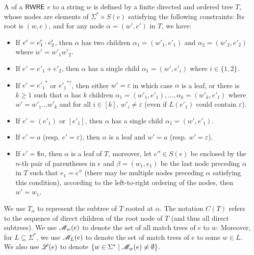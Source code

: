   \begin{definition}
  	A  of a ${\sf RWRE}$ $e$ to a string $w$ is defined by a finite directed and ordered
  	tree $T$, whose nodes are elements of $\Sigma^{\ast} \times S (e)$ satisfying the following constraints: Its root is $(w, e)$, and for any node $\alpha =
  	(w', e')$ in $T$, we have:
  	\begin{itemize}
  		\item If $e' = e'_1 \cdot e'_2$, then $\alpha$ has two children $\alpha_1 = (w'_1,
  		e'_1)$ and $\alpha_2=(w'_2, e'_2)$ where $w' = w'_1 w'_2$.
  		
  		\item If $e' = e'_1 + e'_2$, then $\alpha$ has a single child $\alpha_1 = (w',
  		e'_i)$ where $i \in \{ 1, 2 \}$.
  		
  		\item If $e' = {e'_1}^{\ast}$ or ${e'_1}^{\ast ?}$, then either $w' = \varepsilon$ in which case $\alpha$ is a
  		leaf, or there is $k \geqslant 1$ such that $\alpha$ has $k$ children $\alpha_1 = (w'_1,
  		e'_1), \ldots, \alpha_k = (w'_k, e'_1)$ where $w' = w'_1 \ldots w'_k$ and for all
  		$i \in [k]$, $w'_i \neq \varepsilon$ (even if  $L
  		(e'_1)$ could contain $\varepsilon$).
%
%		
  		\item If $e' = (e'_1)$ or $[e'_1]$, then $\alpha$ has a single child $\alpha_1 = (w', e'_1)$.
  		\item If $e' = a$ (resp. $e' = \varepsilon$), then $\alpha$ is a leaf and
  		$w' = a$ (resp. $w' = \varepsilon$).
%		
		\item If $e' = \$n$, then $\alpha$ is a leaf of $T$, moreover, let $e'' \in S(e)$ be enclosed by the $n$-th pair of parentheses in $e$ and $\beta = (w_1, e_1)$ be the last node preceding $\alpha$ in $T$ such that $e_1 = e''$ (there may be multiple nodes preceding $\alpha$ satisfying this condition), 
		according to the left-to-right ordering of the nodes, then $w' = w_1$.
  	\end{itemize}
  	
 We use $T_\alpha$ to represent the subtree of $T$ rooted at $\alpha$.
The notation $C(T)$ refers to the sequence of direct children of the root node of $T$ (and thus all direct subtrees).
%
We use $\mathscr{M}_{w}(e)$ to denote the set of all match trees of $e$ to $w$. Moreover, for $L \subseteq \Sigma^\ast$, we use $\mathscr{M}_{L}(e)$ to denote the set of match trees of $e$ to some $w \in L$.
We also use $\mathscr{L}(e)$ to denote $\{w \in \Sigma^* \mid \mathscr{M}_w(e) \neq \emptyset\}$. 
  \end{definition}
  
